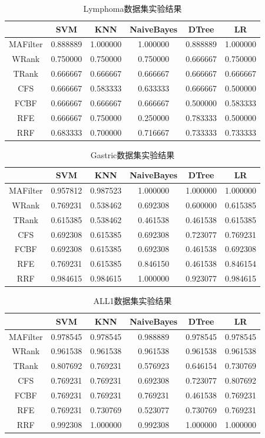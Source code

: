 \documentclass{njubachelor}
\begin{document}
\begin{table}        
\centering
\caption{Lymphoma数据集实验结果}
\begin{tabular}{cccccc}
\hline
  & SVM & KNN & NaiveBayes & DTree & LR\\
\hline
MAFilter&	0.888889&	1.000000	&1.000000	&0.888889&	1.000000\\
WRank	&0.750000&	0.750000	&0.750000	&0.666667	&0.750000\\
TRank&	0.666667	&0.666667&	0.666667	&0.666667&	0.666667\\
CFS&	0.666667	&0.583333	&0.633333&	0.666667&	0.500000\\
FCBF&	0.666667&	0.666667	&0.666667	&0.500000	&0.583333\\
RFE	&0.666667	&0.750000&	0.250000&	0.783333&	0.500000\\
RRF	&0.683333&	0.700000&	0.716667&	0.733333&	0.733333\\
\hline
\end{tabular}
\end{table}


\begin{table}        
\centering
\caption{Gastric数据集实验结果}
\begin{tabular}{cccccc}
\hline
  & SVM & KNN & NaiveBayes & DTree & LR\\
\hline
MAFilter&	0.957812&	0.987523&	1.000000&	1.000000&	1.000000\\
WRank	&0.769231&	0.538462&	0.692308&	0.600000	&0.615385\\
TRank	&0.615385&	0.538462&	0.461538&	0.461538&	0.615385\\
CFS	&0.692308&	0.615385&	0.692308&	0.723077	&0.769231\\
FCBF&	0.692308&	0.615385&	0.692308&	0.461538&	0.692308\\
RFE&	0.769231&	0.615385&	0.846150&	0.461538&	0.846154\\
RRF&	0.984615&	0.984615&	1.000000&	0.923077&	0.984615\\
\hline
\end{tabular}
\end{table}

\begin{table}        
\centering
\caption{ALL1数据集实验结果}
\begin{tabular}{cccccc}
\hline
  & SVM & KNN & NaiveBayes & DTree & LR\\
\hline
MAFilter&	0.978545&	0.978545&	0.988889&	0.978545&	0.978545\\
WRank	&0.961538&	0.961538&	0.961538&	0.961538&	0.961538\\
TRank	&0.807692&	0.769231&	0.576923&	0.646154&	0.730769\\
CFS	&0.769231	&0.769231&	0.692308	&0.723077&	0.807692\\
FCBF&	0.769231&	0.769231&	0.769231&	0.461538&	0.769231\\
RFE&	0.769231&	0.730769&	0.523077&	0.730769&	0.769231\\
RRF&	0.992308&	1.000000&	0.992308&	1.000000&	1.000000\\
\hline
\end{tabular}
\end{table}
\end{document}
